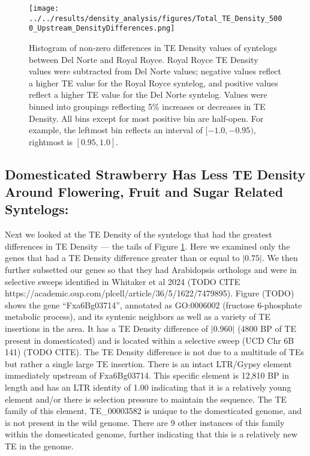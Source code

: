 \documentclass[fleqn,10pt]{olplainarticle}
\begin{document}
\begin{figure}[ht]
\centering
\texttt{[image: ../../results/density\_analysis/figures/Total\_TE\_Density\_5000\_Upstream\_DensityDifferences.png]}
\caption{
Histogram of non-zero differences in TE Density values of syntelogs between Del Norte and Royal Royce.
Royal Royce TE Density values were subtracted from Del Norte values; negative values reflect a higher TE value for the Royal Royce syntelog, and positive values reflect a higher TE value for the Del Norte syntelog.
Values were binned into groupings reflecting 5\% increases or decreases in TE Density.
All bins except for most positive bin are half-open.
For example, the leftmost bin reflects an interval of $[-1.0, -0.95)$, rightmost is $[0.95, 1.0]$.
}
\label{fig:syntelog_5000_total}
\end{figure}



\subsection{Domesticated Strawberry Has Less TE Density Around Flowering, Fruit and Sugar Related Syntelogs:}
Next we looked at the TE Density of the syntelogs that had the greatest differences in TE Density --- the tails of Figure \ref{fig:syntelog_5000_total}.
Here we examined only the genes that had a TE Density difference greater than or equal to $\lvert 0.75 \rvert$.
We then further subsetted our genes so that they had Arabidopsis orthologs and were in selective sweeps identified in Whitaker et al 2024 (TODO CITE https://academic.oup.com/plcell/article/36/5/1622/7479895).
Figure (TODO) shows the gene ``Fxa6Bg03714'', annotated as GO:0006002 (fructose 6-phosphate metabolic process), and its syntenic neighbors as well as a variety of TE insertions in the area.
It has a TE Density difference of $\lvert 0.960 \rvert$ (4800 BP of TE present in domesticated) and is located within a selective sweep (UCD Chr 6B 141) (TODO CITE).
The TE Density difference is not due to a multitude of TEs but rather a single large TE insertion.
There is an intact LTR/Gypsy element immediately upstream of Fxa6Bg03714.
This specific element is 12,810 BP in length and has an LTR identity of 1.00 indicating that it is a relatively young element and/or there is selection pressure to maintain the sequence.
The TE family of this element, TE\_00003582 is unique to the domesticated genome, and is not present in the wild genome.
There are 9 other instances of this family within the domesticated genome, further indicating that this is a relatively new TE in the genome.
\end{document}
